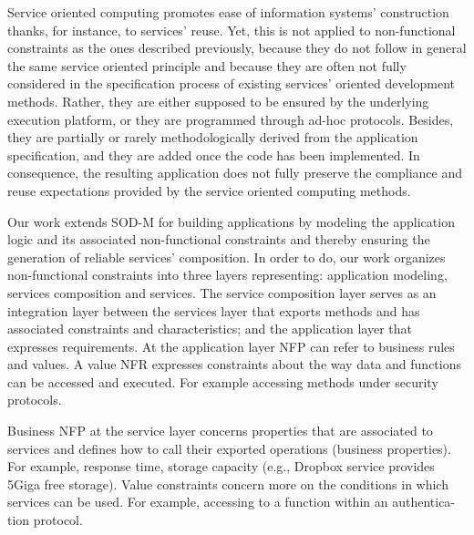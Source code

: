 Service oriented computing promotes ease of information systems' construction thanks, for instance, to services' reuse. Yet, this is not applied to non-functional constraints as the ones described previously, because they do not follow in general the same service oriented principle and because they are often not fully considered in the specification process of existing services' oriented development methods. Rather, they   are either supposed to be ensured by the underlying execution platform, or they are programmed through ad-hoc protocols. Besides,  they are partially or rarely methodologically derived from the application specification, and they are added once the code has been implemented. In consequence, the resulting application does not fully preserve the compliance and reuse expectations provided by the service oriented computing methods.


%
%
Our work extends SOD-M for building applications by modeling the application logic and its associated non-functional constraints and thereby ensuring the generation of reliable services' composition. 
In order to do, our work organizes non-functional constraints into 
three layers representing: application modeling, services composition and services. The service composition layer serves as an integration layer between the services layer that exports methods and has associated constraints and characteristics; and the application layer that expresses requirements.
At the application layer NFP can refer to business rules and values. A value NFR expresses constraints about the way data and functions can be accessed and executed. For example accessing methods under security protocols.

Business NFP at the service layer concerns properties that are associated to services and defines how to call their exported operations (business properties). For example, response time, storage capacity (e.g., Dropbox service provides 5Giga free storage). Value constraints concern more on the conditions in which services can be used. For example, accessing to a function within an authentica-tion protocol.

